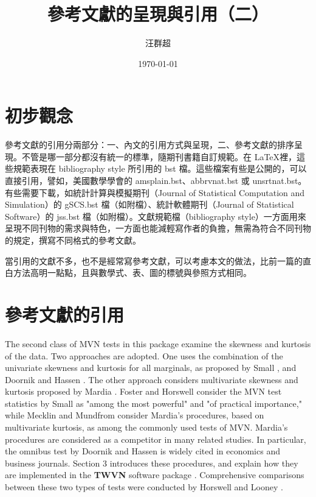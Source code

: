 \title{ {\MB 參考文獻的呈現與引用（二）}}		%
\author{{\SM 汪群超}}						%
\date{{\TT \today }} 							 

\maketitle
\fontsize{12}{22pt}\selectfont 
\section{初步觀念}
參考文獻的引用分兩部分：一、內文的引用方式與呈現，二、參考文獻的排序呈現。不管是哪一部分都沒有統一的標準，隨期刊書籍自訂規範。在   \LaTeX 裡，這些規範表現在 bibliography style 所引用的 bst 檔。這些檔案有些是公開的，可以直接引用，譬如，美國數學學會的 amsplain.bst、abbrvnat.bst 或 unsrtnat.bst。有些需要下載，如統計計算與模擬期刊（Journal of Statistical Computation and Simulation）的 gSCS.bst 檔（如附檔）、統計軟體期刊（Journal of Statistical Software）的 jss.bst 檔（如附檔）。文獻規範檔（bibliography style）一方面用來呈現不同刊物的需求與特色，一方面也能減輕寫作者的負擔，無需為符合不同刊物的規定，撰寫不同格式的參考文獻。

當引用的文獻不多，也不是經常寫參考文獻，可以考慮本文的做法，比前一篇的直白方法高明一點點，且與數學式、表、圖的標號與參照方式相同。

\section{參考文獻的引用}
The second class of MVN tests in this package examine the skewness and kurtosis of the data. Two approaches are adopted. One uses the combination of the univariate skewness and kurtosis for all marginals, as proposed by Small \cite{SMALL:1980}, and Doornik and Hassen \cite{DOORNIK:2008}. The other approach considers multivariate skewness and kurtosis proposed by Mardia \cite{MARDIA:1970}.   Foster \cite{FOSTER:1981} and Horswell \cite{HORSWELL:1990} consider the MVN test statistics by Small as "among the most powerful" and "of practical importance,"  while  Mecklin and Mundfrom \cite{MM} consider Mardia's procedures, based on multivariate kurtosis, as among the commonly used tests of MVN.  Mardia's procedures are considered as a competitor  in many related studies.
In particular, the omnibus test by  Doornik and Hassen \cite{DOORNIK:2008} is widely cited in economics and business journals. Section 3 introduces these procedures, and explain how they are implemented in the \textbf{TWVN}  software package \cite{WH}. Comprehensive  comparisons between these two types of tests were conducted by Horswell and Looney \cite{HORSWELL:1992}.

